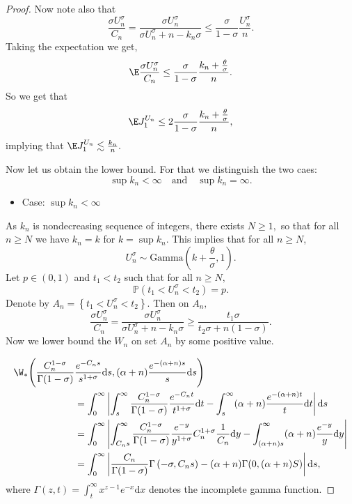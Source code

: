 \begin{proof}
    
    Now note also that 
    \[
    \frac{\sigma U_n^\sigma}{C_n} = \frac{\sigma U_n^\sigma}{\sigma U_n^\sigma + n - k_n\sigma} \leq \frac{\sigma}{1-\sigma}\frac{U_n^\sigma}{n}.
    \]
    Taking the expectation we get,
    \[
    \E \frac{\sigma U_n^\sigma}{C_n} \leq \frac{\sigma}{1-\sigma}\frac{k_n + \frac{\theta}{\sigma}}{n}.
    \]
    So we get that
    \[
    \E J_1^{U_n} \leq 2\frac{\sigma}{1-\sigma}\frac{k_n + \frac{\theta}{\sigma}}{n},
    \]
    implying that $\E J_1^{U_n}\lesssim \frac{k_n}{n}.$

    Now let us obtain the lower bound. For that we distinguish the two caes:
    \[
    \sup k_n < \infty \quad \text{and} \quad \sup k_n = \infty.
    \]
    \begin{itemize}
        \item Case: $\sup k_n < \infty$
    \end{itemize}
    As $k_n$ is nondecreasing sequence of integers, there exists $N \geq 1,$ so that for all $n \geq N $ we have $k_n = k$ for $k = \sup k_n.$ This implies that for all $n \geq N$,
    \[
    U_n^\sigma \sim \mathrm{Gamma}\left(k +\frac{\theta}{\sigma},1\right).
    \]
    Let $p \in (0,1)$ and $t_1<t_2$ such that for all $n \geq N,$
    \[
    \mathbb{P}\left(t_1 < U_n^\sigma < t_2\right) = p.
    \]
    Denote by $A_n = \left\{ t_1 < U_n^\sigma < t_2 \right\}$. Then on $A_n,$
    \[
    \frac{\sigma U_n^\sigma}{C_n} = \frac{\sigma U_n^\sigma}{\sigma U_n^\sigma + n - k_n\sigma} \geq \frac{t_1 \sigma}{t_2 \sigma + n(1-\sigma)}.
    \]
    Now we lower bound the $W_n$ on set $A_n$ by some positive value.

    \begin{align*}
        \W_*\Bigg(\frac{C_n^{1-\sigma}}{\Gamma(1-\sigma)}&\frac{e^{-C_ns}}{s^{1+\sigma}}\mathrm{d}s, 
                  (\alpha + n)\frac{e^{-(\alpha + n)s}}{s}\mathrm{d}s\Bigg)  \\
        & =\int_0^\infty \left| \int_s^\infty \frac{C_n^{1-\sigma}}{\Gamma(1-\sigma)}\frac{e^{-C_nt}}{t^{1+\sigma}}\mathrm{d}t - \int_s^\infty (\alpha + n)\frac{e^{-(\alpha + n)t}}{t}\mathrm{d}t\right|\mathrm{d}s \\ 
        & = \int_0^\infty \left|\int_{C_ns}^\infty \frac{C_n^{1-\sigma}}{\Gamma(1-\sigma)}\frac{e^{-y}}{y^{1+\sigma}}C_n^{1+\sigma} \frac{1}{C_n}\mathrm{d}y - 
        \int_{(\alpha+n)s}^\infty (\alpha + n) \frac{e^{-y}}{y}\mathrm{d}y\right| \\
        & = \int_0^\infty \left| \frac{C_n}{\Gamma(1-\sigma)}\Gamma\left(-\sigma, C_ns\right) - (\alpha + n)\Gamma(0, (\alpha + n)S)\right|\mathrm{d}s,
    \end{align*}
    where $\Gamma(z,t) = \int_t^\infty x^{z-1}e^{-x}\mathrm{d}x$ denotes the incomplete gamma function.


\end{proof}
